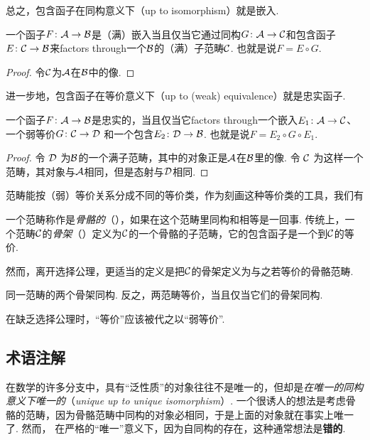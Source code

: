   总之，包含函子在同构意义下（up to isomorphism）就是嵌入.
  \begin{prop}
    一个函子$F\colon {\cal A} \to {\cal B}$是（满）嵌入当且仅当它通过同构$G\colon {\cal A} \to {\cal C}$和包含函子$E\colon {\cal C} \to {\cal B}$来factors through一个${\cal B}$的（满）子范畴${\cal C}$. 也就是说$F=E\circ G$.
  \end{prop}
  \begin{proof}
    令${\cal C}$为${\cal A}$在${\cal B}$中的像.
  \end{proof}
  进一步地，包含函子在等价意义下（up to (weak) equivalence）就是忠实函子.
  \begin{prop}
    一个函子$F\colon {\cal A} \to {\cal B}$是忠实的，当且仅当它factors through一个嵌入$E_1\colon{\cal A}\to{\cal C}$、一个弱等价$G\colon{\cal C}\to{\cal D}$ 和一个包含$E_2\colon{\cal D}\to{\cal B}$. 也就是说$F=E_2\circ G\circ E_1$.
  \end{prop}
  \begin{proof}
    令 ${\cal D}$ 为${\cal B}$的一个满子范畴，其中的对象正是${\cal A}$在${\cal B}$里的像.
    令 ${\cal C}$ 为这样一个范畴，其对象与${\cal A}$相同，但是态射与${\cal D}$相同.
  \end{proof}

  范畴能按（弱）等价关系分成不同的等价类，作为刻画这种等价类的工具，我们有
  \begin{defn}
    一个范畴称作是\emph{骨骼的}（），如果在这个范畴里同构和相等是一回事.
    传统上，一个范畴${\cal C}$的\emph{骨架}（）定义为${\cal C}$的一个骨骼的子范畴，它的包含函子是一个到${\cal C}$的等价.
  \end{defn}
  \begin{rem}
    然而，离开选择公理，更适当的定义是把${\cal C}$的骨架定义为与之若等价的骨骼范畴.
  \end{rem}
  \begin{prop}
    同一范畴的两个骨架同构. 反之，两范畴等价，当且仅当它们的骨架同构.
  \end{prop}
  \begin{rem}
    在缺乏选择公理时，``等价''应该被代之以``弱等价''.
  \end{rem}

\subsection{术语注解}
    在数学的许多分支中，具有``泛性质''的对象往往不是唯一的，但却是\emph{在唯一的同构意义下唯一的}（\emph{unique up to unique isomorphism}）. 一个很诱人的想法是考虑骨骼的范畴，因为骨骼范畴中同构的对象必相同，于是上面的对象就在事实上唯一了.
    然而， 在严格的``唯一''意义下，因为自同构的存在，这种通常想法是\textbf{错的}.

